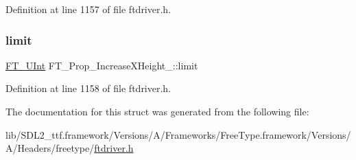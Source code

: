 Definition at line 1157 of file ftdriver.\+h.

\mbox{\label{struct_f_t___prop___increase_x_height___ae276b4241881f9e8ea57fd3a9e9c0d8a}} 
\subsubsection{\texorpdfstring{limit}{limit}}
{\footnotesize\ttfamily \mbox{\hyperlink{fttypes_8h_abcb8db4dbf35d2b55a9e8c7b0926dc52}{F\+T\+\_\+\+U\+Int}} F\+T\+\_\+\+Prop\+\_\+\+Increase\+X\+Height\+\_\+\+::limit}



Definition at line 1158 of file ftdriver.\+h.



The documentation for this struct was generated from the following file\+:\begin{DoxyCompactItemize}
\item 
lib/\+S\+D\+L2\+\_\+ttf.\+framework/\+Versions/\+A/\+Frameworks/\+Free\+Type.\+framework/\+Versions/\+A/\+Headers/freetype/\mbox{\hyperlink{ftdriver_8h}{ftdriver.\+h}}\end{DoxyCompactItemize}
